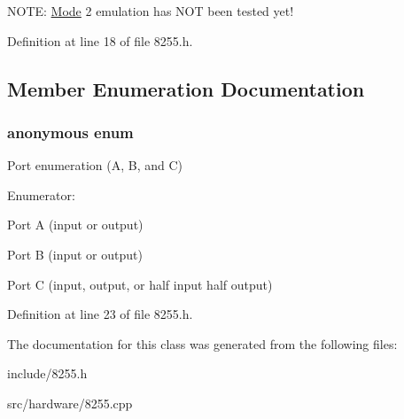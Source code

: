 N\-O\-T\-E\-: \hyperlink{structMode}{Mode} 2 emulation has N\-O\-T been tested yet! 

Definition at line 18 of file 8255.\-h.



\subsection{Member Enumeration Documentation}
\hypertarget{classIntel8255_afad1dcdd07864ccadd09c33e1af473ed}{\subsubsection[{anonymous enum}]{\setlength{\rightskip}{0pt plus 5cm}anonymous enum}}\label{classIntel8255_afad1dcdd07864ccadd09c33e1af473ed}
Port enumeration (A, B, and C) \begin{Desc}
\item[Enumerator\-: ]\par
\begin{description}
\item[{\em 
\hypertarget{classIntel8255_afad1dcdd07864ccadd09c33e1af473eda37629392c4361095a45143d6093e0a71}{Port\-A}\label{classIntel8255_afad1dcdd07864ccadd09c33e1af473eda37629392c4361095a45143d6093e0a71}
}]Port A (input or output) \item[{\em 
\hypertarget{classIntel8255_afad1dcdd07864ccadd09c33e1af473eda480265dca14f2d4b03d6d0f6e9ae66f3}{Port\-B}\label{classIntel8255_afad1dcdd07864ccadd09c33e1af473eda480265dca14f2d4b03d6d0f6e9ae66f3}
}]Port B (input or output) \item[{\em 
\hypertarget{classIntel8255_afad1dcdd07864ccadd09c33e1af473edac42dfe5b4e1996f66b828cb26b79fb95}{Port\-C}\label{classIntel8255_afad1dcdd07864ccadd09c33e1af473edac42dfe5b4e1996f66b828cb26b79fb95}
}]Port C (input, output, or half input half output) \end{description}
\end{Desc}



Definition at line 23 of file 8255.\-h.



The documentation for this class was generated from the following files\-:\begin{DoxyCompactItemize}
\item 
include/8255.\-h\item 
src/hardware/8255.\-cpp\end{DoxyCompactItemize}
